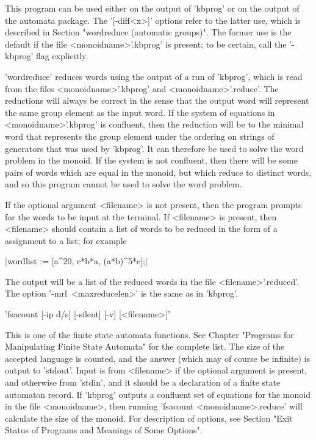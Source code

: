 This program can be used either on the output of 'kbprog' or on the output
of the automata package. The '[-diff<x>]' options refer to the latter use,
which is described in Section
"wordreduce (automatic groups)".
The former use is the default if
the file <monoidname>'.kbprog' is present; to be certain, call the
'-kbprog' flag explicitly.

'wordreduce' reduces words using the output of a run of 'kbprog', which is
read from the files <monoidname>'.kbprog' and <monoidname>'.reduce'.
The reductions will always be
correct in the sense that the output word will represent the same group
element as the input word. If the system of equations in <monoidname>'.kbprog'
is confluent, then the reduction will be to the minimal word that represents
the group element under the ordering on strings of generators that was used
by 'kbprog'. It can therefore be used to solve the word problem in the
monoid. If the system is not confluent, then there will be some pairs of words 
which are equal in the monoid, but which reduce to distinct words, and
so this program cannot be used to solve the word problem.

If the optional argument <filename> is not present, then the program prompts
for the words to be input at the terminal. If <filename> is present, then
<filename> should contain a list of words to be reduced in the form of a
{\GAP} assignment to a list; for example\:

|wordlist := [a^20, c*b*a, (a*b)^5*c];|

The output will be a list of the reduced words in the file <filename>'.reduced'.
The option '-mrl\ <maxreducelen>' is the same as in 'kbprog'.


'fsacount  [-ip d/s] [-silent] [-v] [<filename>]'

This is one of the finite state automata functions. See Chapter 
"Programs for Manipulating Finite State Automata" for the complete list.
The size of the accepted language is counted, and the answer (which may
of course be infinite) is output to 'stdout'. Input is from <filename> if
the optional argument is present, and otherwise from 'stdin', and it
should be a declaration of a finite state automaton record.
If 'kbprog' outputs a confluent set of equations for the monoid in the file
<monoidname>, then running 'fsacount <monoidname>.reduce'
will calculate the size of the monoid.
For description of options, see Section
"Exit Status of Programs and Meanings of Some Options".

